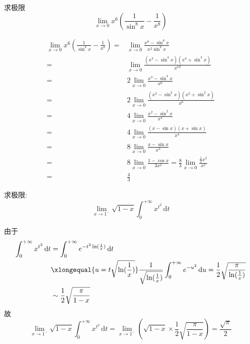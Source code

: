 \documentclass[color=green,titlestyle=hang]{elegantbook}%
\begin{document}
\begin{exercise}
求极限\begin{equation*}\lim_{x\to 0}x^6\left(\frac{1}{\sin^8x}-\frac{1}{x^8}\right)\end{equation*}
\end{exercise}\begin{Solution}\begin{align*}
\lim_{x\to 0}x^6\left(\frac{1}{\sin^8x}-\frac{1}{x^8}\right)=&\lim_{x\to 0}\frac{x^8-\sin^8x}{x^2\sin^{8}x}\\
=&\lim_{x\to 0}\frac{(x^4-\sin^4x)(x^4+\sin^4x)}{x^{10}}\\
=&2\lim_{x\to 0}\frac{x^4-\sin^4x}{x^6}\\
=&2\lim_{x\to 0}\frac{(x^2-\sin^2x)(x^2+\sin^2x)}{x^6}\\
=&4\lim_{x\to 0}\frac{x^2-\sin^2x}{x^4}\\
=&4\lim_{x\to 0}\frac{(x-\sin x)(x+\sin x)}{x^4}\\
=&8\lim_{x\to 0}\frac{x-\sin x}{x^3}\\
=&8\lim_{x\to 0}\frac{1-\cos x}{3x^2}=\frac{8}{3}\lim_{x\to 0}\frac{\frac{1}{2}x^2}{x^2}\\
=&\frac{4}{3}
\end{align*}
\end{Solution}

\begin{example}
求极限: 
\[\lim_{x\to1^-}\sqrt{1-x}\int_0^{+\infty}x^{t^2}\,\mathrm{d}t\]
\end{example}\begin{solution}
由于
\begin{align*}
\int_0^{+\infty}x^{t^2}\,\mathrm{d}t
&=\int_0^{+\infty}e^{-t^2\ln(\frac{1}{x})}\,\mathrm{d}t\\
&\xlongequal{u=t\sqrt{\ln(\frac{1}{x})}}\frac{1}{\sqrt{\ln(\frac{1}{x})}}\int_0^{+\infty}e^{-u^2}\,\mathrm{d}u=\frac{1}{2}\sqrt{\frac{\pi}{\ln(\frac{1}{x})}}\\
&\sim\frac{1}{2}\sqrt{\frac{\pi}{1-x}}
\end{align*}
故\[\lim_{x\to1^-}\sqrt{1-x}\int_0^{+\infty}x^{t^2}\,\mathrm{d}t=\lim_{x\to1^-}\left(\sqrt{1-x}\times\frac{1}{2}\sqrt{\frac{\pi}{1-x}}\right)=\frac{\sqrt{\pi}}{2}\]
\end{solution}
\end{document}
